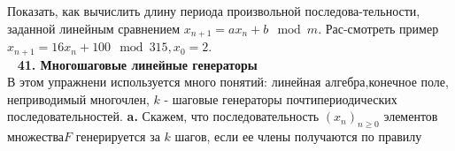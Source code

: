 \documentclass{mai_book}
\begin{document}
	Показать, как вычислить длину периода произвольной последова-\newline тельности, заданной линейным сравнением $x_{n+1}=ax_n+b \mod{m}$. Рас-\newline смотреть пример $x_{n+1}=16x_n+100\mod{315}, x_0=2$.\\
	\ \newline
\noindent\textbf{41. Многошаговые линейные генераторы}\\

	В этом упражнени используется много понятий: линейная алгебра,\newline конечное поле, неприводимый многочлен, $k$ - шаговые генераторы почти\newline периодических последовательностей.\newline
\hspace{15pt}\textbf{a.} Скажем, что последовательность ${(x_n)}_{n\geqslant 0}$ элементов множества\newline $F$ генерируется за $k$ шагов, если ее члены получаются по правилу\newline

\newpage
\end{document}
